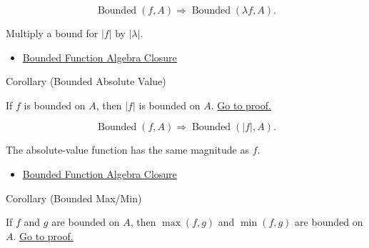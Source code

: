 \begin{remark*}
\[
  \operatorname{Bounded}(f,A)\Rightarrow \operatorname{Bounded}(\lambda f,A).
\]
\end{remark*}

\begin{remark*}[Interpretation]
Multiply a bound for \(|f|\) by \(|\lambda|\).
\end{remark*}

\begin{dependencies}
\begin{itemize}
  \item \hyperref[thm:bounded-function-algebra-closure]{Bounded Function Algebra Closure}
\end{itemize}
\end{dependencies}

\begin{corollarybox}{Corollary (Bounded Absolute Value)}
\begin{corollary}
\label{cor:bounded-absolute-value}
If \(f\) is bounded on \(A\), then \(|f|\) is bounded on \(A\).
\hyperref[prf:bounded-absolute-value]{Go to proof.}
\end{corollary}
\end{corollarybox}

\begin{remark*}
\[
  \operatorname{Bounded}(f,A)\Rightarrow \operatorname{Bounded}(|f|,A).
\]
\end{remark*}

\begin{remark*}[Interpretation]
The absolute-value function has the same magnitude as \(f\).
\end{remark*}

\begin{dependencies}
\begin{itemize}
  \item \hyperref[thm:bounded-function-algebra-closure]{Bounded Function Algebra Closure}
\end{itemize}
\end{dependencies}

\begin{corollarybox}{Corollary (Bounded Max/Min)}
\begin{corollary}
\label{cor:bounded-max-min}
If \(f\) and \(g\) are bounded on \(A\), then \(\max(f,g)\) and
\(\min(f,g)\) are bounded on \(A\).
\hyperref[prf:bounded-max-min]{Go to proof.}
\end{corollary}
\end{corollarybox}

